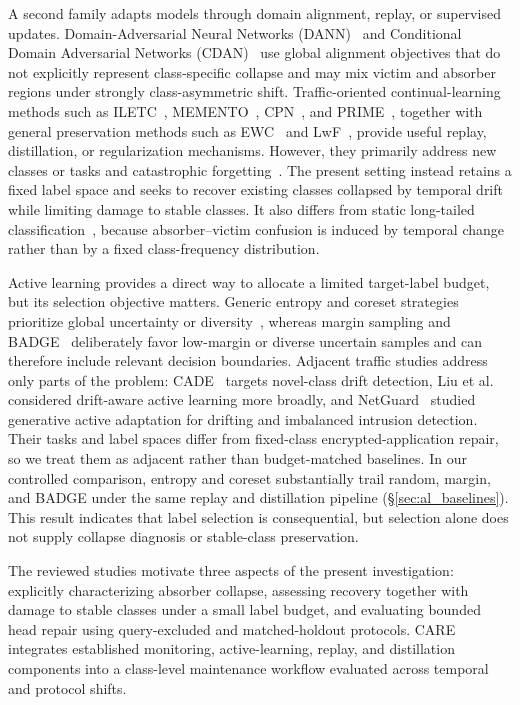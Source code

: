 \documentclass[journal]{IEEEtran}
\begin{document}
A second family adapts models through domain alignment, replay, or supervised updates. Domain-Adversarial Neural Networks (DANN)~\cite{ganin2016dann} and Conditional Domain Adversarial Networks (CDAN)~\cite{long2018cdan} use global alignment objectives that do not explicitly represent class-specific collapse and may mix victim and absorber regions under strongly class-asymmetric shift. Traffic-oriented continual-learning methods such as ILETC~\cite{zhu2023iletc}, MEMENTO~\cite{cerasuolo2024memento}, CPN~\cite{cai2024cpn}, and PRIME~\cite{prime2025}, together with general preservation methods such as EWC~\cite{kirkpatrick2017ewc} and LwF~\cite{li2018lwf}, provide useful replay, distillation, or regularization mechanisms. However, they primarily address new classes or tasks and catastrophic forgetting~\cite{delange2022continual}. The present setting instead retains a fixed label space and seeks to recover existing classes collapsed by temporal drift while limiting damage to stable classes. It also differs from static long-tailed classification~\cite{kang2020decoupling,menon2021longtail}, because absorber--victim confusion is induced by temporal change rather than by a fixed class-frequency distribution.

Active learning provides a direct way to allocate a limited target-label budget, but its selection objective matters. Generic entropy and coreset strategies prioritize global uncertainty or diversity~\cite{settles2009active,sener2018coreset}, whereas margin sampling and BADGE~\cite{ash2020badge} deliberately favor low-margin or diverse uncertain samples and can therefore include relevant decision boundaries. Adjacent traffic studies address only parts of the problem: CADE~\cite{yang2021cade} targets novel-class drift detection, Liu et al.~\cite{micfoal2023} considered drift-aware active learning more broadly, and NetGuard~\cite{netguard2025} studied generative active adaptation for drifting and imbalanced intrusion detection. Their tasks and label spaces differ from fixed-class encrypted-application repair, so we treat them as adjacent rather than budget-matched baselines. In our controlled comparison, entropy and coreset substantially trail random, margin, and BADGE under the same replay and distillation pipeline (\S\ref{sec:al_baselines}). This result indicates that label selection is consequential, but selection alone does not supply collapse diagnosis or stable-class preservation.

The reviewed studies motivate three aspects of the present investigation: explicitly characterizing absorber collapse, assessing recovery together with damage to stable classes under a small label budget, and evaluating bounded head repair using query-excluded and matched-holdout protocols. CARE integrates established monitoring, active-learning, replay, and distillation components into a class-level maintenance workflow evaluated across temporal and protocol shifts.
\end{document}

